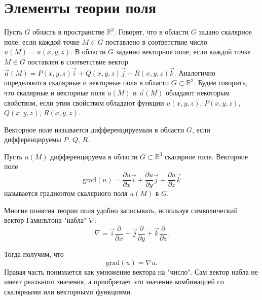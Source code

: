 \section*{Элементы теории поля}

\begin{definition}
    Пусть $ G $ область в пространстве $ \mathbb{R}^{3} $. Говорят, что в области $ G $ задано скалярное поле, если каждой точке
    $ M \in G $ поставлено в соответствие число $ u(M) = u(x, y, z) $. В области $ G $ заданно векторное поле, если каждой точке
    $ M \in G $ поставлен в соответствие вектор $ \vec{a}(M) = P(x, y, z)\vec{i} + Q(x, y, z)\vec{j} + R(x, y, z)\vec{k} $.
    Аналогично определяются скалярные и векторные поля в области $ G \subset \mathbb{R}^{2} $. Будем говорить, что скалярные
    и векторные поля $ u(M) $ и $ \vec{a}(M) $ обладают некоторым свойством, если этим свойством обладают функции $ u(x,y,z) $,
    $ P(x,y,z) $, $ Q(x,y,z) $, $ R(x,y,z) $.
\end{definition}

\begin{definition}
    Векторное поле называется дифференцируемым в области $ G $, если дифференцируемы $ P $, $ Q $, $ R $.
\end{definition}

\begin{definition}
    Пусть $ u(M) $ дифференцируема в области $ G \subset \mathbb{R}^{3} $ скалярное поле. Векторное поле
    \begin{equation} \nonumber
        \text{grad}(u) = \frac{\partial u}{\partial x} \vec{i} + \frac{\partial u}{\partial y} \vec{j} + \frac{\partial u}{\partial z} \vec{k}
    \end{equation}
    называется градиентом скалярного поля $ u(M) $ в $ G $.
\end{definition}

\begin{remark}
    Многие понятия теории поля удобно записывать, используя символический вектор Гамильтона "набла" $ \nabla $:
    \begin{equation} \nonumber
        \nabla = \vec{i} \frac{\partial}{\partial x} + \vec{j} \frac{\partial}{\partial y} + \vec{k} \frac{\partial}{\partial z}.
    \end{equation}
\end{remark}

\begin{remark}
    Тогда получим, что
    \begin{equation} \nonumber
        \text{grad}(u) = \nabla u.
    \end{equation}
    Правая часть понимается как умножение вектора на "число". Сам вектор набла не имеет реального значения, а
    приобретает это значение комбинацией со скалярными или векторными функциями.
\end{remark}


